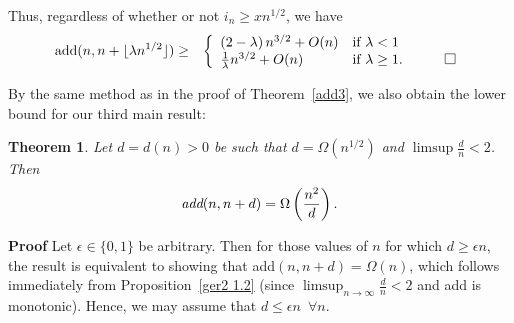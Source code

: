 \documentclass{article}
\newtheorem{Theorem}{Theorem}
\newtheorem{Proof of Theorem}{Proof of Theorem}
\begin{document}
Thus, regardless of whether or not $i_{n} \geq xn^{1/2}$, 
we have 
\begin{eqnarray*}
\textrm{add}(n,n+\lfloor \lambda n^{1/2} \rfloor) 
& \geq & 
\left\{ \begin{array}{ll}
\left( 2 - \lambda \right) n^{3/2} + O(n) & \textrm{if } \lambda < 1 \\
\frac{1}{\lambda} n^{3/2} + O(n) & \textrm{if } \lambda \geq 1. 
\phantom{qwerty} 
\setlength{\unitlength}{.25cm}
\begin{picture}(1,1)
\put(0,0){\line(1,0){1}}
\put(0,0){\line(0,1){1}}
\put(1,1){\line(-1,0){1}}
\put(1,1){\line(0,-1){1}}
\end{picture} \\
\end{array} \right. 
\end{eqnarray*} 















By the same method as in the proof of Theorem~\ref{add3}, 
we also obtain the lower bound for our third main result:















\begin{Theorem} \label{add54}
Let $d = d(n)>0$ be such that $d=\Omega(n^{1/2})$ and $\limsup \frac{d}{n}<2$. 
Then 
\begin{displaymath}
\emph{add}(n,n+d) = \Omega \left( \frac{n^{2}}{d} \right). 
\end{displaymath}
\end{Theorem}
\textbf{Proof}
Let $\epsilon \in \{ 0,1 \}$ be arbitrary.
Then for those values of $n$ for which $d \geq \epsilon n$,
the result is equivalent to showing that add$(n,n+d)=\Omega(n)$,
which follows immediately from Proposition~\ref{ger2 1.2}
(since $\limsup_{n \to \infty} \frac{d}{n} < 2$ and add is monotonic).
Hence, we may assume that $d \leq \epsilon n$~$\forall n$.
\end{document}
